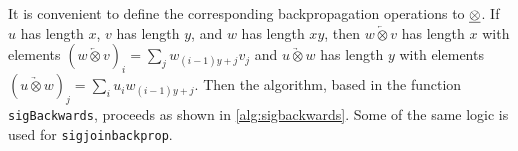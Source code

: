 It is convenient to define the corresponding backpropagation operations to $\underline{\otimes}$. If $u$ has length $x$, $v$ has length $y$, and $w$ has length $xy$, then $w\underleftarrow\otimes v$
has length $x$ with elements $(w\underleftarrow\otimes v)_i=\sum_jw_{(i-1)y+j}v_j$ and $u\underrightarrow\otimes w$ 
has length $y$ with elements $(u\underrightarrow\otimes w)_j=\sum_i u_iw_{(i-1)y+j}$.
Then the algorithm, based in the function \verb|sigBackwards|, proceeds as shown in \autoref{alg:sigbackwards}. Some of the same logic is used for \verb|sigjoinbackprop|.
\iffalse
\begin{algorithm}\caption{sigBackwards\label{alg:sigbackwards}}
\begin{algorithmic}[1]
	\For {$n\gets 1,m$}%
	\State $s^n\gets s_l^n$, calculated using \verb|sig|
	\State $S^n\gets S_l^n$, an input
	\EndFor
	\For {$j\gets l,1$}
	\Statex $\quad$ ($s^n$ is now $s^n_{j}$ and $S^n$ is now $S^n_j$ for each $n$.)
	\State Calculate $r_j$.
	\For {$n\gets m,1$}	%
	\For {$n'\gets (n-1),1$}
	\State $s^{n}\gets s^{n}+(-1)^{n-n'}s^{n'}\kron r_j^{n-n'}$
	\EndFor
	\State $s^{n}\gets s^{n}+(-1)^{n}r_j^n$
	\EndFor
	\Statex $\quad$ ($s^n$ is now $s^n_{j-1}$ for each $n$.)
	\Statex $\quad$ Calculate $R_j$ as follows:
	\For {$n\gets 1,m$}	%
	\State $R^n\gets S^n$
	\EndFor
	\For {$n\gets 1,m$}	%
	\For {$n'\gets (n-1),1$}
	\State $R^{n-n'}\gets R^{n-n'} + s^{n'}\underrightarrow\otimes S^{n}$
	\EndFor
	\EndFor
	\Statex $\quad$ ($R^n$ is now $R^n_{j}$ for each $n$.)
	\State Backpropagate $R^n_j$ through (\ref*{eq:exp}).
	\Statex $\quad$ Calculate $S_{j-1}$ as follows:
	\Statex \Comment \begin{minipage}{0.5\textwidth}(We could calculate $S_{j-1}$ just like we calculated $R_j$,\\
	but we can just update the $S^n$ in place.)\end{minipage}%
	\For {$n'\gets 1,(m-1)$}	
    \For {$n\gets (n'+1,m)$}
    \State $S^{n'}\gets S^{n'} + S^{n}\underleftarrow\otimes r^{n-n'}$
    \EndFor
    \EndFor
    \Statex $\quad$ ($S^n$ is now $S^n_{j-1}$ for each $n$.)
	\EndFor

\end{algorithmic}
\end{algorithm}
\fi 
